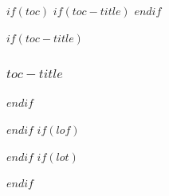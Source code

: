 $if(toc)$
$if(toc-title)$
\renewcommand*\contentsname{$toc-title$}
$endif$
\begin{frame}[allowframebreaks]
$if(toc-title)$
  \frametitle{$toc-title$}
$endif$
  \setcounter{tocdepth}{$toc-depth$}
  \tableofcontents
\end{frame}
$endif$
$if(lof)$
\listoffigures
$endif$
$if(lot)$
\listoftables
$endif$